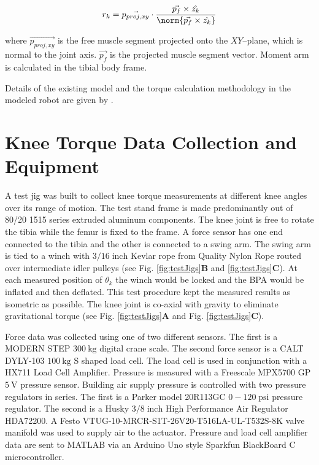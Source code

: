 \begin{equation}
    r_{k} = \Vec{p_{proj,xy}} \cdot \frac{\Vec{p_f} \times \hat{z_{k}}} { \norm{\Vec{p_f} \times \hat{z_{k}} }} \label{eq:project_ma}
\end{equation}

where $\Vec{p_{proj,xy}}$ is the free muscle segment projected onto the $XY$--plane, which is normal to the joint axis. $\Vec{p_f}$ is the projected muscle segment vector. Moment arm is calculated in the tibial body frame.

Details of the existing model and the torque calculation methodology in the modeled robot are given by \citet{bolen_determination_2019, morrow_optimization_2020}.


\section{Knee Torque Data Collection and Equipment}\label{sec:torque_equipment}


A test jig was built to collect knee torque measurements at different knee angles over its range of motion. The test stand frame is made predominantly out of 80/20 1515 series extruded aluminum components. The knee joint is free to rotate the tibia while the femur is fixed to the frame. A force sensor has one end connected to the tibia and the other is connected to a swing arm. The swing arm is tied to a winch with $3/16\; \text{inch}$ Kevlar rope from Quality Nylon Rope routed over intermediate idler pulleys (see Fig. \ref{fig:testJigs}\textbf{B} and \ref{fig:testJigs}\textbf{C}). At each measured position of $\theta_{k}$ the winch would be locked and the BPA would be inflated and then deflated. This test procedure kept the measured results as isometric as possible.  The knee joint is co-axial with gravity to eliminate gravitational torque (see Fig. \ref{fig:testJigs}\textbf{A} and Fig. \ref{fig:testJigs}\textbf{C}).

Force data was collected using one of two different sensors. The first is a MODERN STEP $\qty{300}{\kilo\gram}$ digital crane scale. The second force sensor is a CALT DYLY-103 $\qty{100}{\kilo\gram}$ S shaped load cell. The load cell is used in conjunction with a HX711 Load Cell Amplifier. Pressure is measured with a Freescale MPX5700 GP $\qty{5}{\volt}$ pressure sensor. Building air supply pressure is controlled with two pressure regulators in series. The first is a Parker model 20R113GC $0-120\; \text{psi}$ pressure regulator. The second is a Husky $3/8 \; \text{inch}$ High Performance Air Regulator HDA72200. A Festo VTUG-10-MRCR-S1T-26V20-T516LA-UL-T532S-8K valve manifold was used to supply air to the actuator. Pressure and load cell amplifier data are sent to MATLAB via an Arduino Uno style Sparkfun BlackBoard C microcontroller. 

